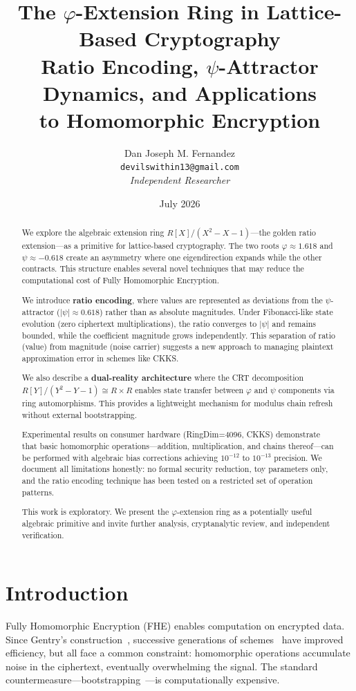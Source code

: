 \documentclass[11pt,a4paper]{article}
\title{\Huge The $\varphi$-Extension Ring in Lattice-Based Cryptography\\[5pt]
\large Ratio Encoding, $\psi$-Attractor Dynamics, and Applications\\to Homomorphic Encryption}
\author{Dan Joseph M. Fernandez\\
\texttt{devilswithin13@gmail.com}\\
\textit{Independent Researcher}}
\date{July 2026}
\begin{document}
\maketitle

\begin{abstract}
We explore the algebraic extension ring $R[X]/(X^2-X-1)$---the golden ratio extension---as a primitive for lattice-based cryptography. The two roots $\varphi \approx 1.618$ and $\psi \approx -0.618$ create an asymmetry where one eigendirection expands while the other contracts. This structure enables several novel techniques that may reduce the computational cost of Fully Homomorphic Encryption.

We introduce \textbf{ratio encoding}, where values are represented as deviations from the $\psi$-attractor ($|\psi| \approx 0.618$) rather than as absolute magnitudes. Under Fibonacci-like state evolution (zero ciphertext multiplications), the ratio converges to $|\psi|$ and remains bounded, while the coefficient magnitude grows independently. This separation of ratio (value) from magnitude (noise carrier) suggests a new approach to managing plaintext approximation error in schemes like CKKS.

We also describe a \textbf{dual-reality architecture} where the CRT decomposition $R[Y]/(Y^2-Y-1) \cong R \times R$ enables state transfer between $\varphi$ and $\psi$ components via ring automorphisms. This provides a lightweight mechanism for modulus chain refresh without external bootstrapping.

Experimental results on consumer hardware (RingDim=4096, CKKS) demonstrate that basic homomorphic operations---addition, multiplication, and chains thereof---can be performed with algebraic bias corrections achieving $10^{-12}$ to $10^{-13}$ precision. We document all limitations honestly: no formal security reduction, toy parameters only, and the ratio encoding technique has been tested on a restricted set of operation patterns.

This work is exploratory. We present the $\varphi$-extension ring as a potentially useful algebraic primitive and invite further analysis, cryptanalytic review, and independent verification.
\end{abstract}

\section{Introduction}

Fully Homomorphic Encryption (FHE) enables computation on encrypted data. Since Gentry's construction~\cite{gentry2009}, successive generations of schemes~\cite{brakerski2012, brakerski2014, fan2012, cheon2017} have improved efficiency, but all face a common constraint: homomorphic operations accumulate noise in the ciphertext, eventually overwhelming the signal. The standard countermeasure---bootstrapping~\cite{gentry2009}---is computationally expensive.
\end{document}
